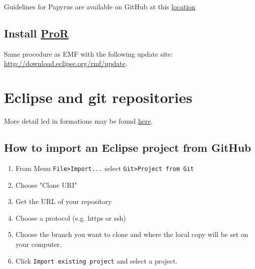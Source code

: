 \documentclass{openetcs_report}
\begin{document}
Guidelines for Papyrus are available on GitHub at this
\href{https://github.com/openETCS/model-evaluation/tree/master/model/Papyrus-CEA-All4tec/papyrus_guidelines}{location}

\subsection{Install \href{http://www.eclipse.org/rmf/pror/}{ProR}}
Same procedure as EMF with the following update site:
\url{http://download.eclipse.org/rmf/update}.

\section{Eclipse and  git repositories}
More detail led in formations may be found \href{http://www.vogella.com/articles/EGit/article.html}{here}.
\subsection{How to import an Eclipse project from GitHub}
\begin{enumerate}
\item From Menu 
\verb+File>Import...+ select \verb+Git>Project from Git+
\item Choose "Clone URI"
\item Get the URL of your repository
\item Choose a protocol (e.g. https or ssh)
\item Choose the branch you want to clone and where the local copy
  will be set on your computer.
\item Click \verb+Import existing project+ and  select a project.

\end{enumerate}



\end{document}
